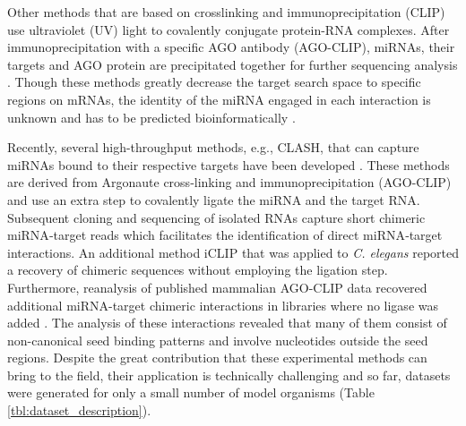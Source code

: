 \documentclass{bmcart}
\begin{document}
Other methods that are based on crosslinking and immunoprecipitation (CLIP) use ultraviolet (UV) light to covalently conjugate protein-RNA complexes. After immunoprecipitation with a specific AGO antibody (AGO-CLIP), miRNAs, their targets and AGO protein are precipitated together for further sequencing analysis \cite{chi2009argonaute, hafner2010transcriptome, zisoulis2010comprehensive}. Though these methods greatly decrease the target search space to specific regions on mRNAs, the identity of the miRNA engaged in each interaction is unknown and has to be predicted bioinformatically \cite{wang2015design, uhl2017computational}.

Recently, several high-throughput methods, e.g., CLASH, that can capture miRNAs bound to their respective targets have been developed \cite{scheel2017global, grosswendt2014unambiguous, darnell_moore2015mirna, helwak2013mapping}. These methods are derived from Argonaute cross‐linking and immunoprecipitation (AGO-CLIP) and use an extra step to covalently ligate the miRNA and the target RNA. Subsequent cloning and sequencing of isolated RNAs capture short chimeric miRNA‐target reads which facilitates the identification of direct miRNA‐target interactions. An additional method iCLIP \cite{broughton2016pairing} that was applied to \textit{C. elegans} reported a recovery of chimeric sequences without employing the ligation step. Furthermore, reanalysis of published mammalian AGO-CLIP data recovered additional  miRNA-target chimeric interactions in libraries where no ligase was added \cite{grosswendt2014unambiguous}. 
The analysis of these interactions revealed that many of them consist of non-canonical seed binding patterns and involve nucleotides outside the seed regions. Despite the great contribution that these experimental methods can bring to the field, their application is technically challenging and so far, datasets were generated for only a small number of model organisms (Table \ref{tbl:dataset_description}).
\end{document}
